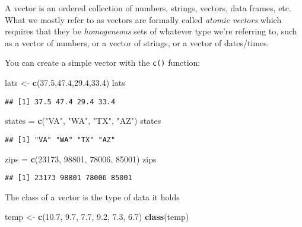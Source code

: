 \documentclass[
]{book}
\newenvironment{Shaded}{\begin{snugshade}}{\end{snugshade}}
\newcommand{\DecValTok}[1]{\textcolor[rgb]{0.00,0.00,0.81}{#1}}
\newcommand{\FloatTok}[1]{\textcolor[rgb]{0.00,0.00,0.81}{#1}}
\newcommand{\KeywordTok}[1]{\textcolor[rgb]{0.13,0.29,0.53}{\textbf{#1}}}
\newcommand{\NormalTok}[1]{#1}
\newcommand{\StringTok}[1]{\textcolor[rgb]{0.31,0.60,0.02}{#1}}
\begin{document}
A vector is an ordered collection of numbers, strings, vectors, data frames, etc.
What we mostly refer to as vectors are formally called \emph{atomic vectors} which requires
that they be \emph{homogeneous} sets of whatever type we're referring to, such as a vector of numbers,
or a vector of strings, or a vector of dates/times.

You can create a simple vector with the \texttt{c()} function:

\begin{Shaded}
\begin{Highlighting}[]
\NormalTok{lats <-}\StringTok{ }\KeywordTok{c}\NormalTok{(}\FloatTok{37.5}\NormalTok{,}\FloatTok{47.4}\NormalTok{,}\FloatTok{29.4}\NormalTok{,}\FloatTok{33.4}\NormalTok{)}
\NormalTok{lats}
\end{Highlighting}
\end{Shaded}

\begin{verbatim}
## [1] 37.5 47.4 29.4 33.4
\end{verbatim}

\begin{Shaded}
\begin{Highlighting}[]
\NormalTok{states =}\StringTok{ }\KeywordTok{c}\NormalTok{(}\StringTok{"VA"}\NormalTok{, }\StringTok{"WA"}\NormalTok{, }\StringTok{"TX"}\NormalTok{, }\StringTok{"AZ"}\NormalTok{)}
\NormalTok{states}
\end{Highlighting}
\end{Shaded}

\begin{verbatim}
## [1] "VA" "WA" "TX" "AZ"
\end{verbatim}

\begin{Shaded}
\begin{Highlighting}[]
\NormalTok{zips =}\StringTok{ }\KeywordTok{c}\NormalTok{(}\DecValTok{23173}\NormalTok{, }\DecValTok{98801}\NormalTok{, }\DecValTok{78006}\NormalTok{, }\DecValTok{85001}\NormalTok{)}
\NormalTok{zips}
\end{Highlighting}
\end{Shaded}

\begin{verbatim}
## [1] 23173 98801 78006 85001
\end{verbatim}

The class of a vector is the type of data it holds

\begin{Shaded}
\begin{Highlighting}[]
\NormalTok{temp <-}\StringTok{ }\KeywordTok{c}\NormalTok{(}\FloatTok{10.7}\NormalTok{, }\FloatTok{9.7}\NormalTok{, }\FloatTok{7.7}\NormalTok{, }\FloatTok{9.2}\NormalTok{, }\FloatTok{7.3}\NormalTok{, }\FloatTok{6.7}\NormalTok{)}
\KeywordTok{class}\NormalTok{(temp)}
\end{Highlighting}
\end{Shaded}
\end{document}
